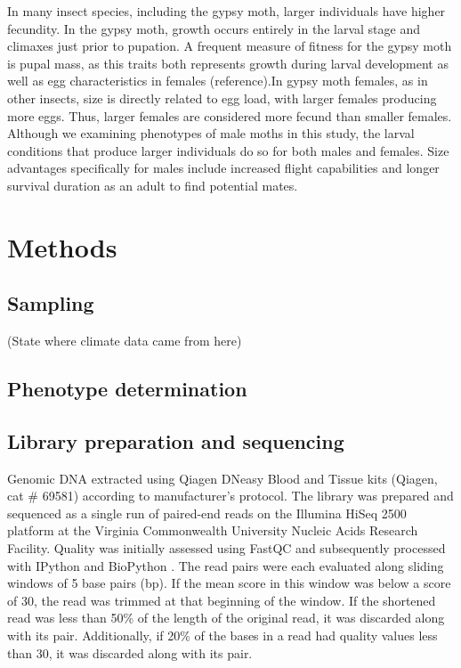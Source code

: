 \documentclass[smallextended]{svjour3}
\begin{document}
In many insect species, including the gypsy moth, larger individuals have higher
fecundity. In the gypsy moth, growth occurs entirely in the larval stage and
climaxes just prior to pupation. A frequent measure of fitness for the gypsy
moth is pupal mass, as this traits both represents growth during larval
development as well as egg characteristics in females (reference).In gypsy moth
females, as in other insects, size is directly related to egg load, with larger
females producing more eggs. Thus, larger females are considered more fecund
than smaller females. Although we examining phenotypes of male moths in this
study, the larval conditions that produce larger individuals do so for both
males and females. Size advantages specifically for males include increased
flight capabilities and longer survival duration as an adult to find potential
mates.


\section*{Methods}

\subsection*{Sampling}

(State where climate data came from here)

\subsection*{Phenotype determination}

\subsection*{Library preparation and sequencing}

Genomic DNA extracted using Qiagen DNeasy Blood and Tissue kits (Qiagen, cat \# 69581)
according to manufacturer's protocol.  The library was prepared and sequenced as
a single run of paired-end reads on the Illumina HiSeq 2500 platform at the
Virginia Commonwealth University Nucleic Acids Research Facility. Quality was
initially assessed using FastQC \citep{fastqc} and subsequently processed with
IPython \citep{Perez:2007hy} and BioPython \citep{Cock:2009hj}. The read pairs
were each evaluated along sliding windows of 5 base pairs (bp).  If the mean
score in this window was below a score of 30, the read was trimmed at that
beginning of the window. If the shortened read was less than 50\% of the length
of the original read, it was discarded along with its pair. Additionally, if
20\% of the bases in a read had quality values less than 30, it was discarded
along with its pair.
\end{document}
